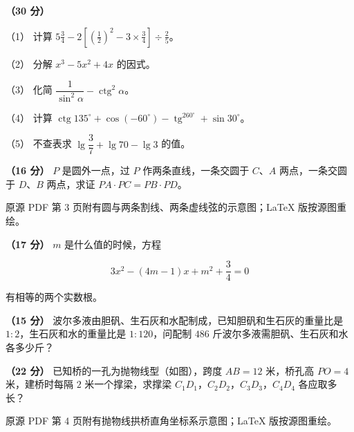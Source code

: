 \begin{question}
\textbf{（30 分）} 

（1） 计算 $5\frac{3}{4}-2\left[\left(\frac{1}{2}\right)^2-3\times\frac{3}{4}\right]\div\frac{2}{5}$。

（2） 分解 $x^3-5x^2+4x$ 的因式。

（3） 化简 $\dfrac{1}{\sin^2\alpha}-\operatorname{ctg}^2\alpha$。

（4） 计算 $\operatorname{ctg}135^\circ+\cos(-60^\circ)-\operatorname{tg}^260^\circ+\sin30^\circ$。

（5） 不查表求 $\lg\dfrac{3}{7}+\lg70-\lg3$ 的值。

\Needspace{0.4\textheight}
\end{question}
\begin{question}
\textbf{（16 分）} $P$ 是圆外一点，过 $P$ 作两条直线，一条交圆于 $C$、$A$ 两点，一条交圆于 $D$、$B$ 两点，求证 $PA\cdot PC=PB\cdot PD$。

\begin{gktip}
原源 PDF 第 3 页附有圆与两条割线、两条虚线弦的示意图；LaTeX 版按源图重绘。
\end{gktip}
\nopagebreak[4]
\begin{center}\end{center}
\nopagebreak[4]
\end{question}
\begin{question}
\textbf{（17 分）} $m$ 是什么值的时候，方程

\nopagebreak[4]
\[
3x^2-(4m-1)x+m^2+\frac{3}{4}=0
\]

有相等的两个实数根。

\end{question}
\begin{question}
\textbf{（15 分）} 波尔多液由胆矾、生石灰和水配制成，已知胆矾和生石灰的重量比是 $1:2$，生石灰和水的重量比是 $1:120$，问配制 $486$ 斤波尔多液需胆矾、生石灰和水各多少斤？

\Needspace{0.4\textheight}
\end{question}
\begin{question}
\textbf{（22 分）} 已知桥的一孔为抛物线型（如图），跨度 $AB=12$ 米，桥孔高 $PO=4$ 米，建桥时每隔 $2$ 米一个撑梁，求撑梁 $C_1D_1$，$C_2D_2$，$C_3D_3$，$C_4D_4$ 各应取多长？

\begin{gktip}
原源 PDF 第 4 页附有抛物线拱桥直角坐标系示意图；LaTeX 版按源图重绘。
\end{gktip}
\nopagebreak[4]
\begin{center}\end{center}
\nopagebreak[4]

\end{question}